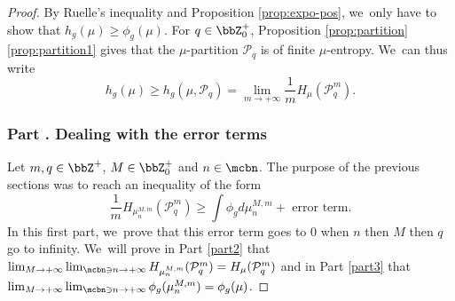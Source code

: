 \begin{proof}
By Ruelle's inequality \cite{Ruelle1978} and Proposition \ref{prop:expo-pos}, we~only have to show that $h_g(\mu) \geq \phi_g(\mu)$.
For $q \in \bbZ_0^+$, Proposition \ref{prop:partition}\eqref{prop:partition1} gives that the $\mu$-partition $\mathcal{P}_q$ is of finite $\mu$-entropy. We~can thus write
\[
h_g(\mu) \geq h_g(\mu,\mathcal{P}_q) = \lim_{m \to +\infty} \frac{1}{m} H_{\mu}(\mathcal{P}_q^m).
\]

\label{part1}%
\subsubsection*{Part \thesubsubsection. Dealing with the error terms}

Let $m,q \in \bbZ^+$, $M \in \bbZ_0^+$ and $n \in \mcbn$.
The purpose of the previous sections was to reach an inequality of the form
\[
\frac{1}{m} H_{\mu_n^{M,m}}(\mathcal{P}_q^m) \geq \int \phi_g d \mu_n^{M,m} + \text{ error term.}
\]
In this first part, we~prove that this error term goes to 0 when $n$ then $M$ then $q$ go to infinity. We~will prove in Part \ref{part2} that
$\lim_{M \to +\infty} \lim_{\mcbn \ni n \to +\infty} H_{\mu_n^{M,m}}(\mathcal{P}_q^m) = H_{\mu}(\mathcal{P}_q^m)$ and in Part \ref{part3} that $\lim_{M \to +\infty} \lim_{\mcbn \ni n \to +\infty} \phi_g(\mu_n^{M,m}) = \phi_g(\mu)$.


\end{proof}
